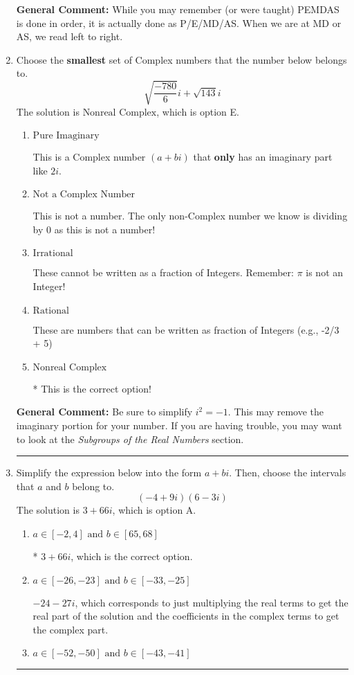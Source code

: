 \documentclass{extbook}[14pt]
\newcommand{\litem}[1]{\item #1

\rule{\textwidth}{0.4pt}}
\begin{document}
\begin{enumerate}
{\textbf{General Comment:} While you may remember (or were taught) PEMDAS is done in order, it is actually done as P/E/MD/AS. When we are at MD or AS, we read left to right.
}
\litem{
Choose the \textbf{smallest} set of Complex numbers that the number below belongs to.
\[ \sqrt{\frac{-780}{6}} i+\sqrt{143}i \]The solution is \( \text{Nonreal Complex} \), which is option E.\begin{enumerate}[label=\Alph*.]
\item \( \text{Pure Imaginary} \)

This is a Complex number $(a+bi)$ that \textbf{only} has an imaginary part like $2i$.
\item \( \text{Not a Complex Number} \)

This is not a number. The only non-Complex number we know is dividing by 0 as this is not a number!
\item \( \text{Irrational} \)

These cannot be written as a fraction of Integers. Remember: $\pi$ is not an Integer!
\item \( \text{Rational} \)

These are numbers that can be written as fraction of Integers (e.g., -2/3 + 5)
\item \( \text{Nonreal Complex} \)

* This is the correct option!
\end{enumerate}

\textbf{General Comment:} Be sure to simplify $i^2 = -1$. This may remove the imaginary portion for your number. If you are having trouble, you may want to look at the \textit{Subgroups of the Real Numbers} section.
}
\litem{
Simplify the expression below into the form $a+bi$. Then, choose the intervals that $a$ and $b$ belong to.
\[ (-4 + 9 i)(6 - 3 i) \]The solution is \( 3 + 66 i \), which is option A.\begin{enumerate}[label=\Alph*.]
\item \( a \in [-2, 4] \text{ and } b \in [65, 68] \)

* $3 + 66 i$, which is the correct option.
\item \( a \in [-26, -23] \text{ and } b \in [-33, -25] \)

 $-24 - 27 i$, which corresponds to just multiplying the real terms to get the real part of the solution and the coefficients in the complex terms to get the complex part.
\item \( a \in [-52, -50] \text{ and } b \in [-43, -41] \)


\end{enumerate}}
\end{enumerate}
\end{document}
